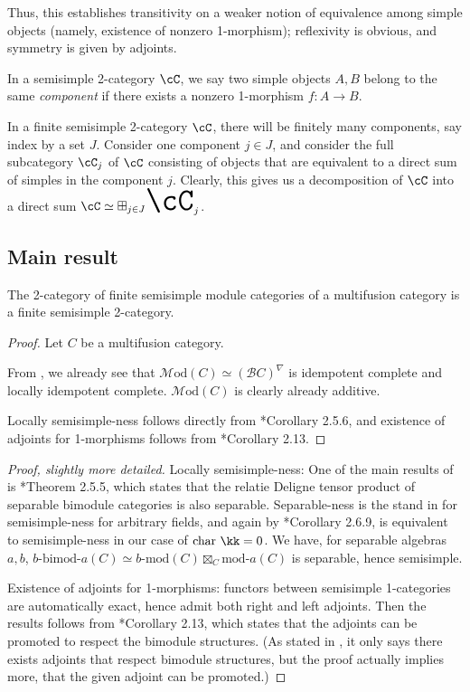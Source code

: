 \documentclass[12pt]{article}
\newcommand{\cB}{{\mathcal{B}}}
\newcommand{\Mod}{{\mathcal{M}\textrm{od}}}
\newcommand{\bigboxplus}{\Huge \boxplus}
\newcommand{\bimod}[2]{{#1\textrm{-bimod-}#2}}
\newcommand{\amod}[1]{{#1\textrm{-mod}}}
\newcommand{\moda}[1]{{\textrm{mod-}#1}}
\newcommand{\ModA}[1]{{\Mod(#1)}}
\begin{document}
Thus, this establishes transitivity on a weaker notion
of equivalence among simple objects
(namely, existence of nonzero 1-morphism);
reflexivity is obvious,
and symmetry is given by adjoints.

\begin{definition}
In a semisimple 2-category $\cC$,
we say two simple objects $A,B$ belong to the same
\emph{component} if there exists a nonzero 1-morphism
$f: A \to B$.
\end{definition}


In a finite semisimple 2-category $\cC$,
there will be finitely many components,
say index by a set $J$.
Consider one component $j \in J$,
and consider the full subcategory $\cC_j$ of $\cC$
consisting of objects that are equivalent
to a direct sum of simples in the component $j$.
Clearly, this gives us a decomposition of $\cC$ into a direct sum
$\cC \simeq \bigboxplus_{j \in J} \cC_j$.


\subsection{Main result}

\begin{theorem}
The 2-category of finite semisimple module categories
of a multifusion category
is a finite semisimple 2-category.
\end{theorem}

\begin{proof}
Let $C$ be a multifusion category.

From ,
we already see that $\ModA{C} \simeq (\cB C)^\nabla$
is idempotent complete
and locally idempotent complete.
$\ModA{C}$ is clearly already additive.


Locally semisimple-ness follows directly from
\cite{DSPSb}*{Corollary 2.5.6},
and existence of adjoints for 1-morphisms
follows from \cite{DSPSa}*{Corollary 2.13}.
\end{proof}

\begin{proof}[Proof, slightly more detailed]
Locally semisimple-ness:
One of the main results of \cite{DSPSb} is
\cite{DSPSb}*{Theorem 2.5.5}, which states that
the relatie Deligne tensor product
of separable bimodule categories is also separable.
Separable-ness is the stand in for semisimple-ness
for arbitrary fields,
and again by \cite{DSPSb}*{Corollary 2.6.9},
is equivalent to semisimple-ness in our case of
$\text{char }\kk = 0$.
We have, for separable algebras $a,b$,
$\bimod{b}{a}(C) \simeq \amod{b}(C) \boxtimes_{C} \moda{a}(C)$
is separable, hence semisimple.

Existence of adjoints for 1-morphisms:
functors between semisimple 1-categories
are automatically exact,
hence admit both right and left adjoints.
Then the results follows from \cite{DSPSa}*{Corollary 2.13},
which states that the adjoints can be promoted
to respect the bimodule structures.
(As stated in \cite{DSPSa}, it only says there
exists adjoints that respect bimodule structures,
but the proof actually implies more,
that the given adjoint can be promoted.)
\end{proof}
\end{document}
